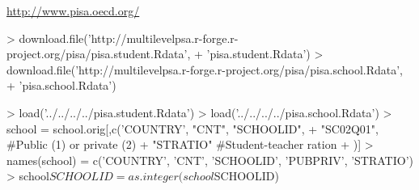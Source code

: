 \documentclass[letterpaper,11pt]{article}
\begin{document}
\url{http://www.pisa.oecd.org/}

\begin{Schunk}
\begin{Sinput}
> download.file('http://multilevelpsa.r-forge.r-project.org/pisa/pisa.student.Rdata', 
+ 'pisa.student.Rdata')
> download.file('http://multilevelpsa.r-forge.r-project.org/pisa/pisa.school.Rdata',
+ 'pisa.school.Rdata')
\end{Sinput}
\end{Schunk}


\begin{Schunk}
\begin{Sinput}
> load('../../../../pisa.student.Rdata')
> load('../../../../pisa.school.Rdata')
> school = school.orig[,c('COUNTRY', "CNT", "SCHOOLID",
+ 	"SC02Q01", #Public (1) or private (2)
+ 	"STRATIO" #Student-teacher ration    
+ )]
> names(school) = c('COUNTRY', 'CNT', 'SCHOOLID', 'PUBPRIV', 'STRATIO')
> school$SCHOOLID = as.integer(school$SCHOOLID)
\end{Sinput}
\end{Schunk}
\end{document}
